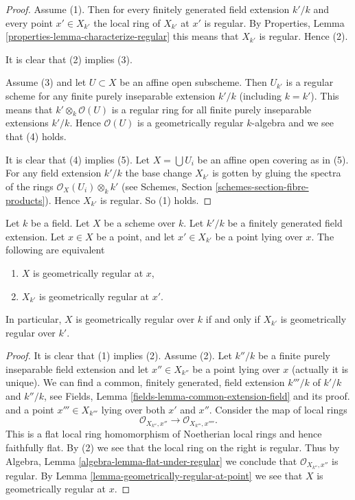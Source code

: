 \begin{proof}
Assume (1). Then for every finitely generated field extension
$k'/k$ and
every point $x' \in X_{k'}$ the local ring of $X_{k'}$ at $x'$
is regular. By Properties, Lemma \ref{properties-lemma-characterize-regular}
this means that $X_{k'}$ is regular. Hence (2).

\medskip\noindent
It is clear that (2) implies (3).

\medskip\noindent
Assume (3) and let $U \subset X$ be an affine open subscheme.
Then $U_{k'}$ is a regular scheme for any finite purely inseparable
extension $k'/k$ (including $k = k'$). This means that
$k' \otimes_k \mathcal{O}(U)$ is a regular ring for all
finite purely inseparable extensions $k'/k$. Hence
$\mathcal{O}(U)$ is a geometrically regular $k$-algebra
and we see that (4) holds.

\medskip\noindent
It is clear that (4) implies (5). Let $X = \bigcup U_i$ be an affine
open covering as in (5). For any field extension $k'/k$ the base
change $X_{k'}$ is gotten by gluing the spectra of the
rings $\mathcal{O}_X(U_i) \otimes_k k'$ (see
Schemes, Section \ref{schemes-section-fibre-products}).
Hence $X_{k'}$ is regular. So (1) holds.
\end{proof}

\begin{lemma}
\label{lemma-geometrically-regular-upstairs}
Let $k$ be a field.
Let $X$ be a scheme over $k$.
Let $k'/k$ be a finitely generated field extension.
Let $x \in X$ be a point, and let $x' \in X_{k'}$ be a point lying over $x$.
The following are equivalent
\begin{enumerate}
\item $X$ is geometrically regular at $x$,
\item $X_{k'}$ is geometrically regular at $x'$.
\end{enumerate}
In particular, $X$ is geometrically regular over $k$ if and only if
$X_{k'}$ is geometrically regular over $k'$.
\end{lemma}

\begin{proof}
It is clear that (1) implies (2). Assume (2).
Let $k''/k$ be a finite purely inseparable field extension
and let $x'' \in X_{k''}$ be a point lying over $x$ (actually it is
unique). We can find a common, finitely generated, field extension
$k'''/k$ of $k'/k$ and $k''/k$, see
Fields, Lemma \ref{fields-lemma-common-extension-field} and its proof.
and a point $x''' \in X_{k'''}$ lying over both $x'$ and $x''$.
Consider the map of local rings
$$
\mathcal{O}_{X_{k''}, x''} \longrightarrow \mathcal{O}_{X_{k'''}, x''''}.
$$
This is a flat local ring homomorphism of Noetherian local rings
and hence faithfully flat.
By (2) we see that the local ring on the right is regular.
Thus by Algebra, Lemma \ref{algebra-lemma-flat-under-regular}
we conclude that $\mathcal{O}_{X_{k''}, x''}$ is regular.
By Lemma \ref{lemma-geometrically-regular-at-point} we see that $X$
is geometrically regular at $x$.
\end{proof}

